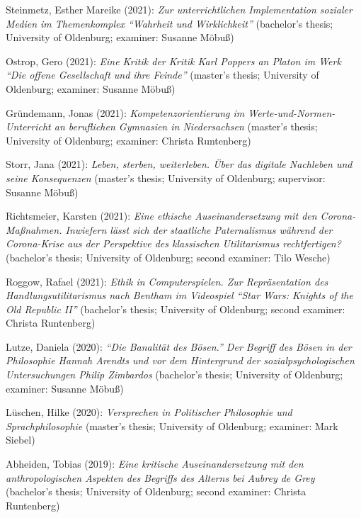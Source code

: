 \documentclass[a4paper,10pt]{article}
\newenvironment{literature}{%
   \parskip6pt\parindent0pt\raggedright
   \def\lititem{\hangindent=1cm\hangafter1}}{%
   \par\ignorespaces}
\begin{document}
\begin{literature}
\lititem Steinmetz, Esther Mareike (2021): \textit{Zur unterrichtlichen Implementation sozialer Medien im Themenkomplex \enquote{Wahrheit und Wirklichkeit}} (bachelor's thesis; University of Oldenburg; examiner: Susanne Möbuß)

\lititem Ostrop, Gero (2021): \textit{Eine Kritik der Kritik Karl Poppers an Platon im Werk \enquote{Die offene Gesellschaft und ihre Feinde}} (master's thesis; University of Oldenburg; examiner: Susanne Möbuß)

\lititem Gründemann, Jonas (2021): \textit{Kompetenzorientierung im Werte-und-Normen-Unterricht an beruflichen Gymnasien in Niedersachsen} (master's thesis; University of Oldenburg; examiner: Christa Runtenberg)

\lititem Storr, Jana (2021): \textit{Leben, sterben, weiterleben. Über das digitale Nachleben und seine Konsequenzen} (master's thesis; University of Oldenburg; supervisor: Susanne Möbuß)

\lititem Richtsmeier, Karsten (2021): \textit{Eine ethische Auseinandersetzung mit den Corona-Maßnahmen. Inwiefern lässt sich der staatliche Paternalismus während der Corona-Krise aus der Perspektive des klassischen Utilitarismus rechtfertigen?} (bachelor's thesis; University of Oldenburg; second examiner: Tilo Wesche)

\lititem Roggow, Rafael (2021): \textit{Ethik in Computerspielen. Zur Repräsentation des Handlungsutilitarismus nach Bentham im Videospiel \enquote{Star Wars: Knights of the Old Republic II}} (bachelor's thesis; University of Oldenburg; second examiner: Christa Runtenberg)

\lititem Lutze, Daniela (2020): \textit{\enquote{Die Banalität des Bösen.} Der Begriff des Bösen in der Philosophie Hannah Arendts und vor dem Hintergrund der sozialpsychologischen Untersuchungen Philip Zimbardos} (bachelor's thesis; University of Oldenburg; examiner: Susanne Möbuß)

\lititem Lüschen, Hilke (2020): \textit{Versprechen in Politischer Philosophie und Sprachphilosophie} (master's thesis; University of Oldenburg; examiner: Mark Siebel)

\lititem Abheiden, Tobias (2019): \textit{Eine kritische Auseinandersetzung mit den anthropologischen Aspekten des Begriffs des Alterns bei Aubrey de Grey} (bachelor's thesis; University of Oldenburg; second examiner: Christa Runtenberg)
\end{literature}


\clearpage
\end{document}
